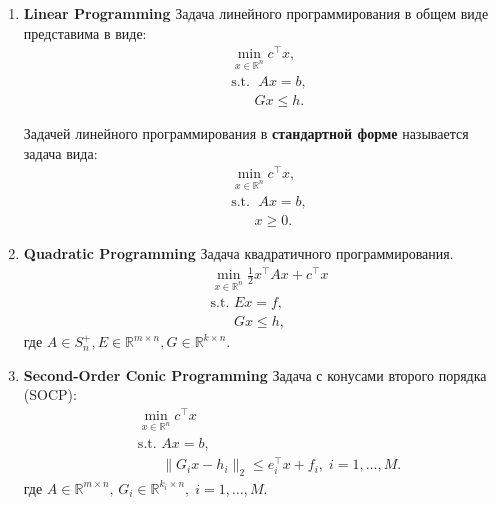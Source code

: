 \begin{enumerate}
    \item \textbf{Linear Programming}
          Задача линейного программирования в общем виде представима в виде:
          \begin{equation}
              \begin{aligned}
                   & \min_{x \in \mathbb{R}^n} c^\top x, \\
                   & \text{s.t. } \; Ax = b,             \\
                   & \phantom{\text{s.t. }} Gx \leq h.
              \end{aligned}
          \end{equation}

          Задачей линейного программирования в \textbf{стандартной форме} называется задача вида:
          \begin{equation}
              \begin{aligned}
                   & \min_{x \in \mathbb{R}^n} c^\top x, \\
                   & \text{s.t. } \; Ax = b,             \\
                   & \phantom{\text{s.t. }} x \geq 0.
              \end{aligned}
          \end{equation}

    \item \textbf{Quadratic Programming}
          Задача квадратичного программирования.
          \begin{equation}
              \begin{aligned}
                   & \min_{x \in \mathbb{R}^n} \frac{1}{2} x^\top A x + c^\top x \\
                   & \text{s.t. } Ex = f,                                        \\
                   & \phantom{\text{s.t. }} Gx \leq h,
              \end{aligned}
          \end{equation}
          где  $A \in S_n^+, E \in \mathbb{R}^{m \times n}, G \in \mathbb{R}^{k \times n}$.

    \item \textbf{Second-Order Conic Programming}
          Задача с конусами второго порядка (SOCP):
          \begin{equation}
              \begin{aligned}
                   & \min_{x \in \mathbb{R}^n} c^\top x                                                    \\
                   & \text{s.t. } Ax = b,                                                                  \\
                   & \phantom{\text{s.t. }} \| G_i x - h_i \|_2 \leq e_i^\top x + f_i, \; i = 1, \dots, M.
              \end{aligned}
          \end{equation}
          где \( A \in \mathbb{R}^{m \times n}, \, G_i \in \mathbb{R}^{k_i \times n}, \; i = 1, \dots, M. \)


\end{enumerate}
